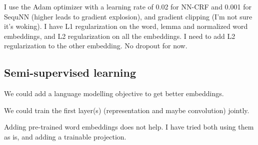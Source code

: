 \documentclass[10pt,a4paper]{article}
\begin{document}
I use the Adam optimizer with a learning rate of 0.02 for NN-CRF and 0.001 for SequNN (higher leads to gradient explosion), and gradient clipping (I'm not sure it's woking). I have L1 regularization on the word, lemma and normalized word embeddings, and L2 regularization on all the embeddings. I need to add L2 regularization to the other embedding. No dropout for now.


\subsection{Semi-supervised learning}

We could add a language modelling objective to get better embeddings.

We could train the first layer(s) (representation and maybe convolution) jointly.

Adding pre-trained word embeddings does not help. I have tried both using them as is, and adding a trainable projection.

\nocite{*}
{}

\end{document}
